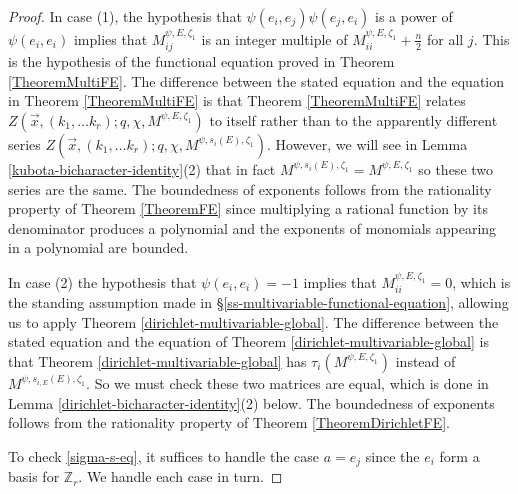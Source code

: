 \documentclass[11pt,letterpaper]{article}
\theoremstyle{definition}
\theoremstyle{remark}
\numberwithin{equation}{section}
\theoremstyle{dotless}
\newcommand{\hchi}{\psi} %
\newcommand{\gene}{\zeta_1} %
\begin{document}
\begin{proof}In case (1), the hypothesis that  $\hchi(e_i,e_j) \hchi(e_j,e_i) $ is a power of $\hchi(e_i,e_i)$ implies that   $M^{\hchi,E,\gene}_{ij}$ is an integer multiple of $M^{\hchi, E,\gene}_{ii}+ \frac{n}{2}$ for all $j$. This is the hypothesis of the functional equation proved in Theorem \ref{TheoremMultiFE}. The difference between the stated equation and the equation in Theorem \ref{TheoremMultiFE} is that Theorem \ref{TheoremMultiFE} relates $Z(\vec{x}, (k_1, \ldots k_r); q, \chi, M^{\hchi,E, \gene})$ to itself rather than to the apparently different series $Z(\vec{x}, (k_1, \ldots k_r); q, \chi, M^{\hchi,s_i(E), \gene})$. However, we will see in Lemma \ref{kubota-bicharacter-identity}(2) that in fact $M^{\hchi,s_i(E), \gene}= M^{\hchi,E, \gene}$ so these two series are the same. The boundedness of exponents follows from the rationality property of Theorem \ref{TheoremFE} since multiplying a rational function by its denominator produces a polynomial and the exponents of monomials appearing in a polynomial are bounded.


In case (2) the hypothesis that $\hchi(e_i,e_i)=-1$ implies that $M^{\hchi, E,\gene}_{ii}=0$, which is the standing assumption made in \S\ref{ss-multivariable-functional-equation}, allowing us to apply Theorem \ref{dirichlet-multivariable-global}. The difference between the stated equation and the equation of Theorem \ref{dirichlet-multivariable-global} is that Theorem \ref{dirichlet-multivariable-global} has $\tau_i(M^{\hchi,E, \gene})$ instead of  $M^{\hchi,s_{i,E}(E) , \gene} $. So we must check these two matrices are equal, which is done in Lemma \ref{dirichlet-bicharacter-identity}(2) below. The boundedness of exponents follows from the rationality property of Theorem \ref{TheoremDirichletFE}.

To check \eqref{sigma-s-eq}, it suffices to handle the case $a = e_j$ since the $e_i$ form a basis for $\mathbb Z_r$. We handle each case in turn.


\end{proof}
\end{document}
